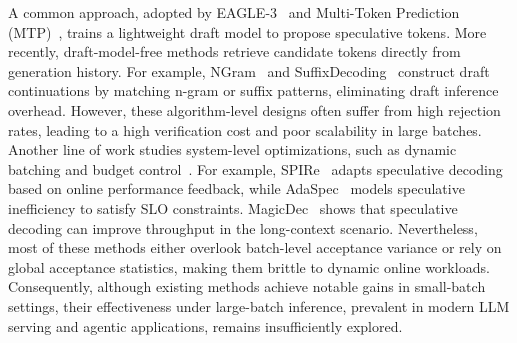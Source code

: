 A common approach, adopted by EAGLE-3~\citep{DBLP:journals/corr/abs-2503-01840} and Multi-Token Prediction (MTP)~\citep{DBLP:journals/corr/abs-2505-07608,DBLP:journals/corr/abs-2412-19437}, trains a lightweight draft model to propose speculative tokens.
More recently, draft-model-free methods retrieve candidate tokens directly from generation history. For example, NGram~\citep{saxena2023prompt} and SuffixDecoding~\citep{oliaro2025suffixdecoding} construct draft continuations by matching n-gram or suffix patterns, eliminating draft inference overhead. However, these algorithm-level designs often suffer from high rejection rates, leading to a high verification cost and poor scalability in large batches. 
%
Another line of work studies system-level optimizations, such as dynamic batching and budget control~\citep{DBLP:journals/corr/abs-2305-09781,10.1145/3772052.3772239,liu2024optimizing}. For example, 
SPIRe~\citep{DBLP:journals/corr/abs-2504-06419} adapts speculative decoding based on online performance feedback, while AdaSpec~\citep{10.1145/3772052.3772239} models speculative inefficiency to satisfy SLO constraints.
MagicDec~\citep{DBLP:conf/iclr/SadhukhanCCTLSY25} shows that speculative decoding can improve throughput in the long-context scenario. Nevertheless, most of these methods either overlook batch-level acceptance variance or rely on global acceptance statistics, making them brittle to dynamic online workloads.
%
Consequently, although existing methods achieve notable gains in small-batch settings, their effectiveness under large-batch inference, prevalent in modern LLM serving and agentic applications, remains insufficiently explored.